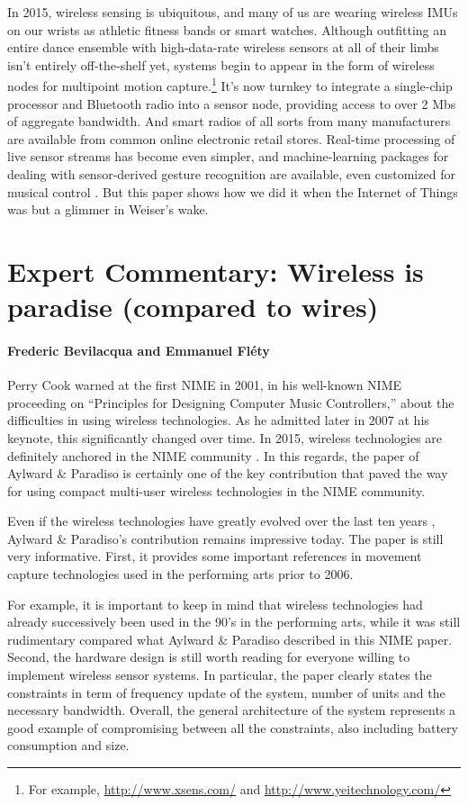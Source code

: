 In 2015, wireless sensing is ubiquitous, and many of us are wearing wireless IMUs on our wrists as athletic fitness bands or smart watches.  Although outfitting an entire dance ensemble with high-data-rate wireless sensors at all of their limbs isn't entirely off-the-shelf yet, systems begin to appear in the form of wireless nodes for multipoint motion capture.\footnote{For example, \url{http://www.xsens.com/} and \url{http://www.yeitechnology.com/}}  It's now turnkey to integrate a single-chip processor and Bluetooth radio into a sensor node, providing access to over 2 Mbs of aggregate bandwidth.  And smart radios of all sorts from many manufacturers are available from common online electronic retail stores. Real-time processing of live sensor streams has become even simpler, and machine-learning packages for dealing with sensor-derived gesture recognition are available, even customized for musical control \cite{Gillian:2014}.  But this paper shows how we did it when the Internet of Things was but a glimmer in Weiser's wake.


\section*{Expert Commentary: Wireless is paradise (compared to wires)}
\paragraph{Frederic Bevilacqua and Emmanuel Fl\'ety}

Perry Cook warned at the first NIME in 2001, in his well-known NIME proceeding on ``Principles for Designing Computer Music Controllers,'' about the difficulties in using wireless technologies. As he admitted later in 2007 at his keynote, this significantly changed over time. In 2015, wireless technologies are definitely anchored in the NIME community \cite{Mitchell:2014}. In this regards, the paper of Aylward \& Paradiso is certainly one of the key contribution that paved the way for using compact multi-user wireless technologies in the NIME community.


Even if the wireless technologies have greatly evolved over the last ten years \cite{Flety:2011}, Aylward \& Paradiso's contribution remains impressive today. The paper is still very informative. First, it provides some important references in movement capture technologies used in the performing arts prior to 2006. 

For example, it is important to keep in mind that wireless technologies had already successively been used in the 90's in the performing arts, while it was still rudimentary compared what Aylward \& Paradiso described in this NIME paper. Second, the hardware design is still worth reading for everyone willing to implement wireless sensor systems. In particular, the paper clearly states the constraints in term of frequency update of the system, number of units and the necessary bandwidth. Overall, the general architecture of the system represents a good example of compromising between all the constraints, also including battery consumption and size.

